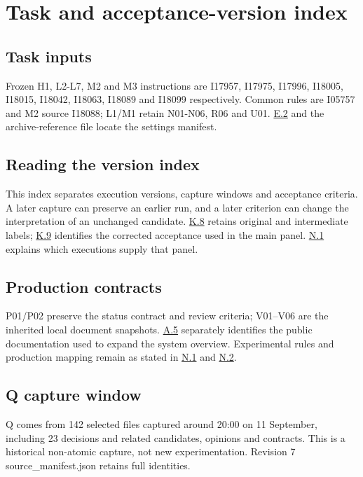 \section[Task and acceptance-version index]{\texorpdfstring{\protect\hypertarget{appendix-k}{}Task and acceptance-version index}{Task and acceptance-version index}}
\subsection[Task inputs]{\texorpdfstring{\protect\hypertarget{k1}{}Task inputs}{Task inputs}}
Frozen H1, L2-L7, M2 and M3 instructions are I17957, I17975, I17996, I18005, I18015, I18042, I18063, I18089 and I18099 respectively. Common rules are I05757 and M2 source I18088; L1/M1 retain N01-N06, R06 and U01. \hyperlink{e2}{E.2} and the archive-reference file locate the settings manifest.

\subsection[Reading the version index]{\texorpdfstring{\protect\hypertarget{k2}{}Reading the version index}{Reading the version index}}
This index separates execution versions, capture windows and acceptance criteria. A later capture can preserve an earlier run, and a later criterion can change the interpretation of an unchanged candidate. \hyperlink{k8}{K.8} retains original and intermediate labels; \hyperlink{k9}{K.9} identifies the corrected acceptance used in the main panel. \hyperlink{n1}{N.1} explains which executions supply that panel.

\subsection[Production contracts]{\texorpdfstring{\protect\hypertarget{k3}{}Production contracts}{Production contracts}}
P01/P02 preserve the status contract and review criteria; V01–V06 are the inherited local document snapshots. \hyperlink{a5}{A.5} separately identifies the public documentation used to expand the system overview. Experimental rules and production mapping remain as stated in \hyperlink{n1}{N.1} and \hyperlink{n2}{N.2}.

\subsection[Q capture window]{\texorpdfstring{\protect\hypertarget{k4}{}Q capture window}{Q capture window}}
Q comes from 142 selected files captured around 20:00 on 11 September, including 23 decisions and related candidates, opinions and contracts. This is a historical non-atomic capture, not new experimentation. Revision 7 source\_manifest.json retains full identities.

